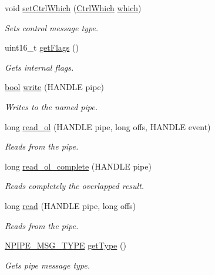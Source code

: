\begin{DoxyCompactItemize}
void \hyperlink{class_win_n_pipe_ctrl_message_af6e558bdf5d3bbc4c06745b65dd92a52}{set\+Ctrl\+Which} (\hyperlink{windows__ipc_8hpp_a584396bb9236c4d39596e9f285a43313}{Ctrl\+Which} \hyperlink{class_win_n_pipe_ctrl_message_a05a30a0c0a7ecee05dd02c8d03e6f1d5}{which})
\begin{DoxyCompactList}\small\item\em Sets control message type. \end{DoxyCompactList}\item 
uint16\+\_\+t \hyperlink{class_win_n_pipe_ctrl_message_a83bc6e7548a8b01aa00128d592d6b987}{get\+Flags} ()
\begin{DoxyCompactList}\small\item\em Gets internal flags. \end{DoxyCompactList}\item 
\hyperlink{avb__gptp_8h_af6a258d8f3ee5206d682d799316314b1}{bool} \hyperlink{class_windows_n_pipe_message_a1a6e0ed523a40350e1e0c44510d9caab}{write} (H\+A\+N\+D\+LE pipe)
\begin{DoxyCompactList}\small\item\em Writes to the named pipe. \end{DoxyCompactList}\item 
long \hyperlink{class_windows_n_pipe_message_a25ac1b47d55092db7e7204a83f6d3367}{read\+\_\+ol} (H\+A\+N\+D\+LE pipe, long offs, H\+A\+N\+D\+LE event)
\begin{DoxyCompactList}\small\item\em Reads from the pipe. \end{DoxyCompactList}\item 
long \hyperlink{class_windows_n_pipe_message_ad65e923c3adebfc9ff97d89007bf5633}{read\+\_\+ol\+\_\+complete} (H\+A\+N\+D\+LE pipe)
\begin{DoxyCompactList}\small\item\em Reads completely the overlapped result. \end{DoxyCompactList}\item 
long \hyperlink{class_windows_n_pipe_message_aefaf53a62a09b658795b4bff415c8c68}{read} (H\+A\+N\+D\+LE pipe, long offs)
\begin{DoxyCompactList}\small\item\em Reads from the pipe. \end{DoxyCompactList}\item 
\hyperlink{windows__ipc_8hpp_a5a7d5ebd4af251aa73a4afcce1dc68a1}{N\+P\+I\+P\+E\+\_\+\+M\+S\+G\+\_\+\+T\+Y\+PE} \hyperlink{class_windows_n_pipe_message_a7bafd143bb174fae7ef70730c8469f1c}{get\+Type} ()
\begin{DoxyCompactList}\small\item\em Gets pipe message type. \end{DoxyCompactList}\end{DoxyCompactItemize}
